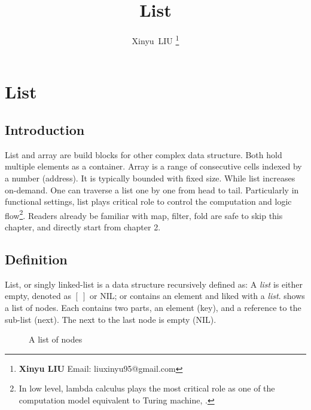 \documentclass[b5paper]{article}
\begin{document}
\title{List}

\author{Xinyu~LIU
\thanks{{\bfseries Xinyu LIU} \newline
  Email: liuxinyu95@gmail.com \newline}
  }

\maketitle
\fi


\ifx\wholebook\relax
\chapter{List}
\fi

\section{Introduction}
\label{introduction}

List and array are build blocks for other complex data structure. Both hold multiple elements as a container. Array is a range of consecutive cells indexed by a number (address). It is typically bounded with fixed size. While list increases on-demand. One can traverse a list one by one from head to tail. Particularly in functional settings, list plays critical role to control the computation and logic flow\footnote{In low level, lambda calculus plays the most critical role as one of the computation model equivalent to Turing machine\cite{mittype}, \cite{unplugged}.}. Readers already be familiar with map, filter, fold are safe to skip this chapter, and directly start from chapter 2.

\section{Definition}

List, or singly linked-list is a data structure recursively defined as: A {\em list} is either empty, denoted as $[\ ]$ or NIL; or contains an element and liked with a {\em list}.  shows a list of nodes. Each contains two parts, an element (key), and a reference to the sub-list (next). The next to the last node is empty (NIL).

\begin{figure}[htbp]
  \centering
  \caption{A list of nodes}
  \label{fig:list-example}
\end{figure}
\end{document}
